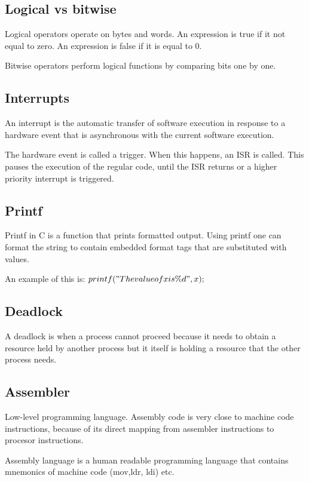 \subsection{Logical vs bitwise}

Logical operators operate on bytes and words.
An expression is true if it not equal to zero. An expression is false
if it is equal to 0.

Bitwise operators perform logical functions by comparing bits one by one.



\subsection{Interrupts}
An interrupt is the automatic transfer of software execution in response to a hardware event that is asynchronous with the current software execution.

The hardware event is called a trigger. When this happens, an ISR is called.
This pauses the execution of the regular code, until the ISR returns or a
higher priority interrupt is triggered.


\subsection{Printf}

Printf in C is a function that prints formatted output.
Using printf one can format the string to contain embedded format tags
that are substituted with values.

An example of this is:
$printf("The value of x is \%d", x);$

\subsection{Deadlock}

A deadlock is when a process cannot proceed because
it needs to obtain a resource held by another process but
it itself is holding a resource that the other process needs.


\subsection{Assembler}
Low-level programming language.
Assembly code is very close to machine code instructions,
because of its direct mapping from assembler instructions
to procesor instructions.

Assembly language is a human readable programming language that
contains mnemonics of machine code (mov,ldr, ldi) etc.

